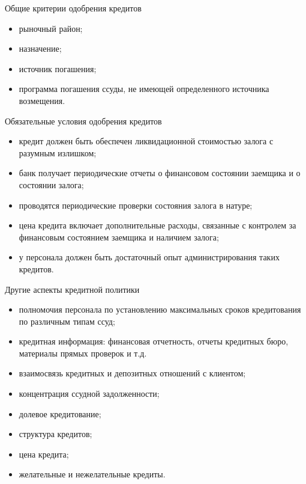 \documentclass[_Banking_p2.tex]{subfiles}
\begin{document}
\begin{frame}{Общие критерии одобрения
	кредитов}
\begin{itemize}
	\item рыночный район;
	\item назначение;
	\item источник погашения;
	\item программа погашения ссуды, не имеющей определенного источника возмещения.
\end{itemize}
\end{frame}
\begin{frame}[ allowframebreaks]{Обязательные условия одобрения
	кредитов}
\begin{itemize}
	\item кредит должен быть обеспечен ликвидационной стоимостью залога с
	разумным излишком;
	\item банк получает периодические отчеты о финансовом состоянии заемщика и о состоянии залога;
	\item проводятся периодические проверки состояния залога в натуре;
	
	\pagebreak 
	\item цена кредита включает дополнительные расходы, связанные с контролем за финансовым состоянием заемщика и наличием залога;
	\item у персонала должен быть достаточный опыт администрирования таких кредитов.
\end{itemize}
\end{frame}

\begin{frame}[allowframebreaks]{Другие аспекты кредитной
	политики}
\begin{itemize}
	\item полномочия персонала по установлению максимальных сроков кредитования по различным типам ссуд;
	\item кредитная информация: финансовая отчетность, отчеты кредитных бюро, материалы прямых проверок и т.д.
	\item взаимосвязь кредитных и депозитных отношений с клиентом;
	
	\pagebreak
	\item концентрация ссудной задолженности;
	\item долевое кредитование;
	\item структура кредитов;
	\item цена кредита;
	\item желательные и нежелательные кредиты.
\end{itemize}
\end{frame}
\end{document}
